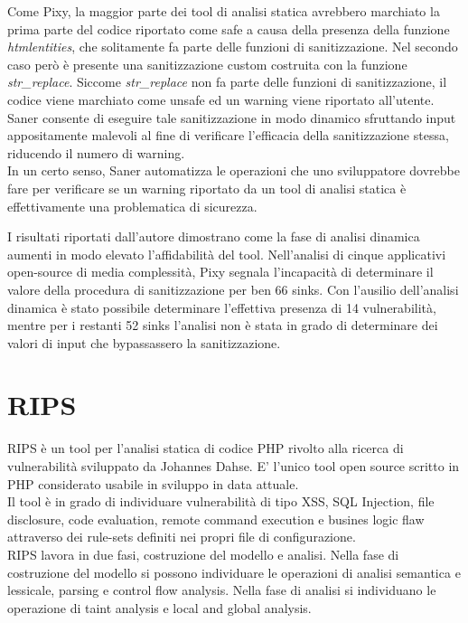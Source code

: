 Come Pixy, la maggior parte dei tool di analisi statica avrebbero marchiato la prima parte del codice riportato come safe a causa della presenza della funzione \emph{htmlentities}, che solitamente fa parte delle funzioni di sanitizzazione. Nel secondo caso però è presente una sanitizzazione custom costruita con la funzione \emph{str\_replace}. Siccome \emph{str\_replace} non fa parte delle funzioni di sanitizzazione, il codice viene marchiato come unsafe ed un warning viene riportato all'utente. Saner consente di eseguire tale sanitizzazione in modo dinamico sfruttando input appositamente malevoli al fine di verificare l'efficacia della sanitizzazione stessa, riducendo il numero di warning.\\
In un certo senso, Saner automatizza le operazioni che uno sviluppatore dovrebbe fare per verificare se un warning riportato da un tool di analisi statica è effettivamente una problematica di sicurezza.

I risultati riportati dall'autore dimostrano come la fase di analisi dinamica aumenti in modo elevato l'affidabilità del tool. Nell'analisi di cinque applicativi open-source di media complessità, Pixy segnala l'incapacità di determinare il valore della procedura di sanitizzazione per ben 66 sinks. Con l'ausilio dell'analisi dinamica è stato possibile determinare l'effettiva presenza di 14 vulnerabilità, mentre per i restanti 52 sinks l'analisi non è stata in grado di determinare dei valori di input che bypassassero la sanitizzazione.

\section{RIPS}
RIPS\cite{rips} è un tool per l'analisi statica di codice PHP rivolto alla ricerca di vulnerabilità sviluppato da Johannes Dahse.
E' l'unico tool open source scritto in PHP considerato usabile in sviluppo in data attuale.\\
Il tool è in grado di individuare vulnerabilità di tipo XSS, SQL Injection, file disclosure, code evaluation, remote command execution e busines logic flaw attraverso dei rule-sets definiti nei propri file di configurazione.\\
RIPS lavora in due fasi, costruzione del modello e analisi. Nella fase di costruzione del modello si possono individuare le operazioni di analisi semantica e lessicale, parsing e control flow analysis. Nella fase di analisi si individuano le operazione di taint analysis e local and global analysis.

